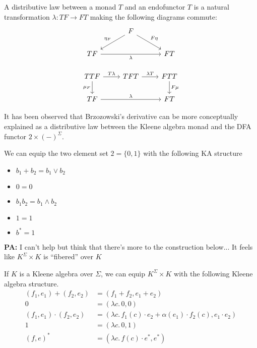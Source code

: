 \documentclass[acmsmall,anonymous,review,screen]{acmart}
\newcommand\makenote[4]{\par\noindent\begin{tcolorbox}
[size=small,colback=#2]\color{#3}\textbf{#4: }#1\end{tcolorbox}\noindent}
\newcommand\pa[1]{\makenote{#1}{cornellred}{white}{PA}}
\begin{document}
\begin{definition}
  A distributive law between a monad $T$ and an endofunctor $T$ is a
  natural transformation $\lambda : TF \to F T$ making the following
  diagrams commute:
\[\begin{tikzcd}
	& F \\
	TF && FT \\
	TTF & TFT & FTT \\
	TF && FT
	\arrow["{\eta_F}"', from=1-2, to=2-1]
	\arrow["{F\eta}", from=1-2, to=2-3]
	\arrow["\lambda"', from=2-1, to=2-3]
	\arrow["{T\lambda}", from=3-1, to=3-2]
	\arrow["{\mu_F}"', from=3-1, to=4-1]
	\arrow["{\lambda T}", from=3-2, to=3-3]
	\arrow["{F \mu}", from=3-3, to=4-3]
	\arrow["\lambda", from=4-1, to=4-3]
\end{tikzcd}\]
\end{definition}


It has been observed that Brzozowski's derivative can be more conceptually
explained as a distributive law between the Kleene algebra monad and the
DFA functor $2 \times (-)^\Sigma$.

\begin{definition}
  We can equip the two element set $2 = \{0, 1 \}$ with the following KA structure
  \begin{itemize}
    \item $b_1 + b_2 = b_1 \lor b_2$
    \item $0 = 0$
    \item $b_1 b_2 = b_1 \land b_2$
    \item $1 = 1$
    \item $b^* = 1$
  \end{itemize}
\end{definition}

\pa{I can't help but think that there's more to the construction
below... It feels like $K^\Sigma \times K$ is ``fibered'' over $K$}

\begin{definition}
  \label{def:nonstandard}
  If $K$ is a Kleene algebra over $\Sigma$, we can equip
  $K^\Sigma \times K$ with the following Kleene algebra
  structure.
    \begin{align*}
    (f_1, e_1) + (f_2, e_2) &= (f_1 + f_2, e_1 + e_2)\\
    0 &= (\lambda c.\, 0, 0)\\
    (f_1, e_1) \cdot (f_2, e_2) &= (\lambda c.\, f_1(c)\cdot e_2 + \alpha(e_1)\cdot f_2(c), e_1\cdot e_2)\\
    1 &= (\lambda c.\, 0, 1)\\
    (f, e)^* &= (\lambda c.\, f(c)\cdot e^*, e^*)
    \end{align*}
\end{definition}
\end{document}
